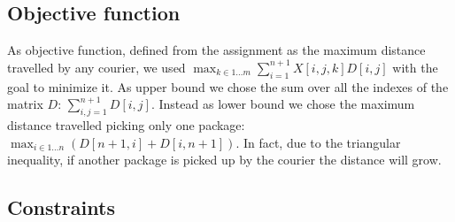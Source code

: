 \subsection{Objective function}
As objective function, defined from the assignment as the maximum distance travelled by any courier, we used $\max_{k \in 1 \dots m}\sum_{i = 1}^{n+1} X[i,j,k]D[i,j]$ with the goal to minimize it. As upper bound we chose the sum over all the indexes of the matrix $D$: $\sum_{i,j = 1}^{n+1} D[i,j]$. Instead as lower bound we chose the maximum distance travelled picking only one package: $\max_{i \in 1 \dots n} (D[n+1,i] + D[i,n+1])$. In fact, due to the triangular inequality, if another package is picked up by the courier the distance will grow. 

\subsection{Constraints}
